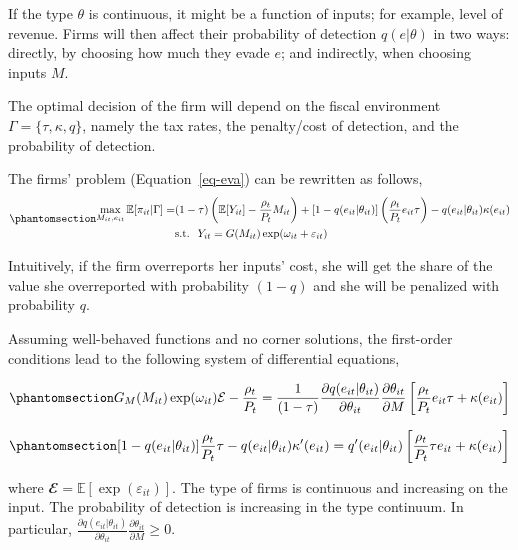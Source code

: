 \documentclass[
  12pt]{article}
\theoremstyle{definition}
\theoremstyle{remark}
\begin{document}
If the type \(\theta\) is continuous, it might be a function of inputs;
for example, level of revenue. Firms will then affect their probability
of detection \(q(e|\theta)\) in two ways: directly, by choosing how much
they evade \(e\); and indirectly, when choosing inputs \(M\).

The optimal decision of the firm will depend on the fiscal environment
\(\Gamma=\{\tau, \kappa, q \}\), namely the tax rates, the penalty/cost
of detection, and the probability of detection.

The firms' problem (Equation~\ref{eq-eva}) can be rewritten as follows,
\begin{equation}\phantomsection\label{eq-eva-2}{
\begin{aligned}
  \max_{M_{it},e_{it}} \mathbb{E}[\pi_{it}|\Gamma] = &(1-\tau)\left(\mathbb{E}[Y_{it}]-\frac{\rho_{t}}{P_t} M_{it}\right)+[1-q(e_{it}|\theta_{it})]\left(\frac{\rho_{t}}{P_t}e_{it}\tau\right)
  -q(e_{it}|\theta_{it})\kappa(e_{it}) \\
  &\text{s.t. }\; Y_{it}=G(M_{it})\exp(\omega_{it}+\varepsilon_{it})
\end{aligned}
}\end{equation}

Intuitively, if the firm overreports her inputs' cost, she will get the
share of the value she overreported with probability \((1-q)\) and she
will be penalized with probability \(q\).

Assuming well-behaved functions and no corner solutions, the first-order
conditions lead to the following system of differential equations,

\begin{equation}\phantomsection\label{eq-foc-cont-m}{
G_M(M_{it})\exp(\omega_{it})\mathcal{E}-\frac{\rho_{t}}{P_t} = \frac{1}{(1-\tau)}\frac{\partial q(e_{it}|\theta_{it})}{\partial \theta_{it}}\frac{\partial \theta_{it}}{\partial M}\left[\frac{\rho_t}{P_t}e_{it}\tau+\kappa(e_{it})\right]
}\end{equation}

\begin{equation}\phantomsection\label{eq-foc-cont-e}{
[1-q(e_{it}|\theta_{it})]\frac{\rho_t}{P_t}\tau-q(e_{it}|\theta_{it})\kappa'(e_{it})=q'(e_{it}|\theta_{it})\left[\frac{\rho_t}{P_t}\tau e_{it} + \kappa(e_{it})\right]
}\end{equation}

where \(\mathbfcal{E}=\mathbb{E}[\exp(\varepsilon_{it})]\). The type of
firms is continuous and increasing on the input. The probability of
detection is increasing in the type continuum. In particular,
\(\frac{\partial q(e_{it}|\theta_{it})}{\partial \theta_{it}}\frac{\partial \theta_{it}}{\partial M}\ge0\).
\end{document}
